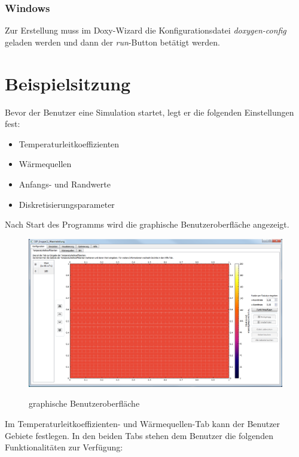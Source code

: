\subsubsection{Windows}
Zur Erstellung muss im Doxy-Wizard die Konfigurationsdatei \emph{doxygen-config} geladen werden und dann der \emph{run}-Button betätigt werden.

\newpage
\section{Beispielsitzung}

Bevor der Benutzer eine Simulation startet, legt er die folgenden Einstellungen fest:
\begin{itemize}
\item Temperaturleitkoeffizienten
\item Wärmequellen
\item Anfangs- und Randwerte
\item Diskretisierungsparameter
\end{itemize}
\noindent
Nach Start des Programms wird die graphische Benutzeroberfläche angezeigt.
\begin{figure}[H]
\centering
\includegraphics[scale=.5]{Benutzerdokumentation/StartAnzeige.png}\\
\caption{graphische Benutzeroberfläche}
\label{graphische Benutzeroberfläche}
\end{figure}

\newpage
\noindent
Im Temperaturleitkoeffizienten- und Wärmequellen-Tab kann der Benutzer Gebiete festlegen. In den beiden Tabs stehen dem Benutzer die folgenden Funktionalitäten zur Verfügung:\\


